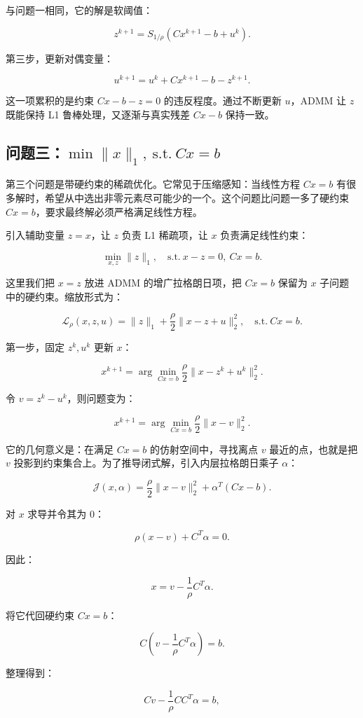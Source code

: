 \documentclass[UTF8,a4paper,12pt,fontset=none]{ctexart}
\begin{document}
与问题一相同，它的解是软阈值：

\[
z^{k+1}=S_{1/\rho}(Cx^{k+1}-b+u^k).
\]

第三步，更新对偶变量：

\[
u^{k+1}=u^k+Cx^{k+1}-b-z^{k+1}.
\]

这一项累积的是约束 $Cx-b-z=0$ 的违反程度。通过不断更新 $u$，ADMM 让 $z$ 既能保持 L1 鲁棒处理，又逐渐与真实残差 $Cx-b$ 保持一致。

\subsection{问题三：$\min\|x\|_1,\ \mathrm{s.t.}\ Cx=b$}

第三个问题是带硬约束的稀疏优化。它常见于压缩感知：当线性方程 $Cx=b$ 有很多解时，希望从中选出非零元素尽可能少的一个。这个问题比问题一多了硬约束 $Cx=b$，要求最终解必须严格满足线性方程。

引入辅助变量 $z=x$，让 $z$ 负责 L1 稀疏项，让 $x$ 负责满足线性约束：

\[
\min_{x,z}\|z\|_1,\quad \mathrm{s.t.}\ x-z=0,\ Cx=b.
\]

这里我们把 $x=z$ 放进 ADMM 的增广拉格朗日项，把 $Cx=b$ 保留为 $x$ 子问题中的硬约束。缩放形式为：

\[
\mathcal L_\rho(x,z,u)=\|z\|_1+\frac{\rho}{2}\|x-z+u\|_2^2,\quad \mathrm{s.t.}\ Cx=b.
\]

第一步，固定 $z^k,u^k$ 更新 $x$：

\[
x^{k+1}=\arg\min_{Cx=b}\frac{\rho}{2}\|x-z^k+u^k\|_2^2.
\]

令 $v=z^k-u^k$，则问题变为：

\[
x^{k+1}=\arg\min_{Cx=b}\frac{\rho}{2}\|x-v\|_2^2.
\]

它的几何意义是：在满足 $Cx=b$ 的仿射空间中，寻找离点 $v$ 最近的点，也就是把 $v$ 投影到约束集合上。为了推导闭式解，引入内层拉格朗日乘子 $\alpha$：

\[
\mathcal J(x,\alpha)=\frac{\rho}{2}\|x-v\|_2^2+\alpha^T(Cx-b).
\]

对 $x$ 求导并令其为 0：

\[
\rho(x-v)+C^T\alpha=0.
\]

因此：

\[
x=v-\frac{1}{\rho}C^T\alpha.
\]

将它代回硬约束 $Cx=b$：

\[
C\left(v-\frac{1}{\rho}C^T\alpha\right)=b.
\]

整理得到：

\[
Cv-\frac{1}{\rho}CC^T\alpha=b,
\]
\end{document}
